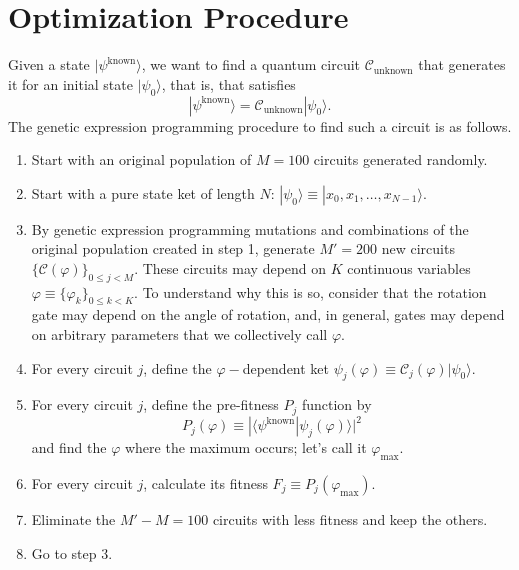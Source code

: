 \documentclass{article}
\begin{document}
\section{Optimization Procedure}
Given a state $|\psi^{\textrm{known}}\rangle$, we want to find a quantum
circuit $\mathcal{C}_{\textrm{unknown}}$ that generates it for an initial state $|\psi_0\rangle$,
that is, that satisfies 
\begin{equation}
	|\psi^{\textrm{known}}\rangle=\mathcal{C}_{\textrm{unknown}}|\psi_0\rangle.
\end{equation}
The genetic expression programming procedure to find such a circuit is as follows.

\begin{enumerate}
	\item Start with an original population of $M=100$ circuits generated randomly.
	\item Start with a pure state ket of length $N$: $|\psi_0\rangle\equiv|x_0, x_1, \ldots, x_{N-1}\rangle$.
	\item By genetic expression programming mutations and combinations of the original 
	population created in step 1, generate $M'=200$ new circuits
	$\{\mathcal{C}(\varphi)\}_{0\le j<M}$. These circuits may depend on
	$K$ continuous variables
	$\varphi\equiv\{\varphi_k\}_{0\le k<K}$. To understand why this is so, consider that the rotation gate
	may depend on the angle of rotation, and, in general, gates may depend on arbitrary parameters that
	we collectively call $\varphi$.
	\item For every circuit $j$, define the $\varphi-$dependent ket $\psi_j(\varphi)\equiv\mathcal{C}_j(\varphi)|\psi_0\rangle$.
	\item For every circuit $j$, define the pre-fitness $P_j$ function by
	\begin{equation}
		P_j(\varphi) \equiv |\langle \psi^{\textrm{known}} | \psi_j(\varphi)\rangle|^2
	\end{equation}
	and find the $\varphi$ where the maximum occurs; let's call it $\varphi_{\textrm{max}}$.
	\item For every circuit $j$, calculate its fitness $F_j \equiv P_j(\varphi_{\textrm{max}})$.
	\item Eliminate the $M'-M=100$ circuits with less fitness and keep the others.
	\item Go to step 3. 
\end{enumerate}
\end{document}
